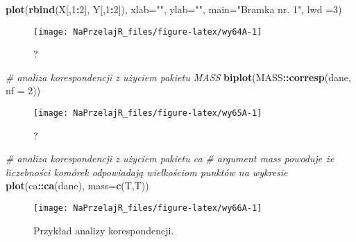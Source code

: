 \documentclass[polish,]{book}
\newenvironment{Shaded}{\begin{snugshade}}{\end{snugshade}}
\newcommand{\CommentTok}[1]{\textcolor[rgb]{0.56,0.35,0.01}{\textit{#1}}}
\newcommand{\DataTypeTok}[1]{\textcolor[rgb]{0.13,0.29,0.53}{#1}}
\newcommand{\DecValTok}[1]{\textcolor[rgb]{0.00,0.00,0.81}{#1}}
\newcommand{\KeywordTok}[1]{\textcolor[rgb]{0.13,0.29,0.53}{\textbf{#1}}}
\newcommand{\NormalTok}[1]{#1}
\newcommand{\OperatorTok}[1]{\textcolor[rgb]{0.81,0.36,0.00}{\textbf{#1}}}
\newcommand{\StringTok}[1]{\textcolor[rgb]{0.31,0.60,0.02}{#1}}
\begin{document}
\begin{Shaded}
\begin{Highlighting}[]
\KeywordTok{plot}\NormalTok{(}\KeywordTok{rbind}\NormalTok{(X[,}\DecValTok{1}\OperatorTok{:}\DecValTok{2}\NormalTok{], Y[,}\DecValTok{1}\OperatorTok{:}\DecValTok{2}\NormalTok{]), }\DataTypeTok{xlab=}\StringTok{""}\NormalTok{, }\DataTypeTok{ylab=}\StringTok{""}\NormalTok{, }\DataTypeTok{main=}\StringTok{"Bramka nr. 1"}\NormalTok{, lwd}
\NormalTok{=}\DecValTok{3}\NormalTok{)}
\end{Highlighting}
\end{Shaded}

\begin{figure}[h]

{\centering \texttt{[image: NaPrzelajR\_files/figure-latex/wy64A-1]} 

}

\caption{?}\label{fig:wy64A}
\end{figure}

\begin{Shaded}
\begin{Highlighting}[]
\CommentTok{# analiza korespondencji z użyciem pakietu MASS}
\KeywordTok{biplot}\NormalTok{(MASS}\OperatorTok{::}\KeywordTok{corresp}\NormalTok{(dane, }\DataTypeTok{nf =} \DecValTok{2}\NormalTok{))}
\end{Highlighting}
\end{Shaded}

\begin{figure}[h]

{\centering \texttt{[image: NaPrzelajR\_files/figure-latex/wy65A-1]} 

}

\caption{?}\label{fig:wy65A}
\end{figure}

\begin{Shaded}
\begin{Highlighting}[]
\CommentTok{# analiza korespondencji z użyciem pakietu ca}
\CommentTok{# argument mass powoduje że liczebności komórek odpowiadają wielkościom punktów na wykresie}
\KeywordTok{plot}\NormalTok{(ca}\OperatorTok{::}\KeywordTok{ca}\NormalTok{(dane), }\DataTypeTok{mass=}\KeywordTok{c}\NormalTok{(T,T))}
\end{Highlighting}
\end{Shaded}

\begin{figure}[h]

{\centering \texttt{[image: NaPrzelajR\_files/figure-latex/wy66A-1]} 

}

\caption{Przykład analizy korespondencji.}\label{fig:wy66A}
\end{figure}
\end{document}
